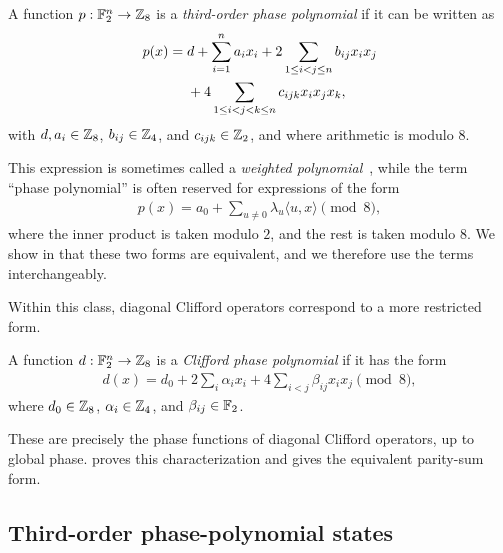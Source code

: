 \begin{definition}\label{def:third-order-phase-polynomial}
A function $p:\mathbb{F}_2^n\to\mathbb{Z}_8$ is a \emph{third-order phase polynomial} if it can be written as
\begin{align}
    p(x) ={}& d + \sum_{i=1}^n a_i x_i
        + 2 \sum_{1 \le i < j \le n} b_{ij} x_i x_j \notag \\
    &+ 4 \sum_{1 \le i < j < k \le n} c_{ijk} x_i x_j x_k,
\end{align}
with $d,a_i \in \mathbb{Z}_8$, $b_{ij} \in \mathbb{Z}_4$, and $c_{ijk} \in \mathbb{Z}_2$, and where arithmetic is modulo $8$.
\end{definition}

This expression is sometimes called a \emph{weighted polynomial}~\cite{campbell2017unified,vuillot2022quantum}, while the term ``phase polynomial'' is often reserved for expressions of the form
\begin{align} \label{eqn:phase-polynomial-def}
    p(x)=a_0+\sum_{u\ne0}\lambda_u\langle u,x\rangle\pmod8,
\end{align}
where the inner product is taken modulo $2$, and the rest is taken modulo $8$. We show in  that these two forms are equivalent, and we therefore use the terms interchangeably.

Within this class, diagonal Clifford operators correspond to a more restricted form.

\begin{definition}\label{def:clifford-phase-polynomial}
A function $d:\mathbb{F}_2^n\to\mathbb{Z}_8$ is a \emph{Clifford phase polynomial} if it has the form
\begin{align}
    d(x)=d_0+2\sum_i \alpha_i x_i
        +4\sum_{i<j}\beta_{ij}x_ix_j \pmod 8,
\end{align}
where $d_0\in\mathbb{Z}_8$, $\alpha_i\in\mathbb{Z}_4$, and $\beta_{ij}\in\mathbb{F}_2$.
\end{definition}

These are precisely the phase functions of diagonal Clifford operators, up to global phase.  proves this characterization and gives the equivalent parity-sum form.

\subsection{Third-order phase-polynomial states}

